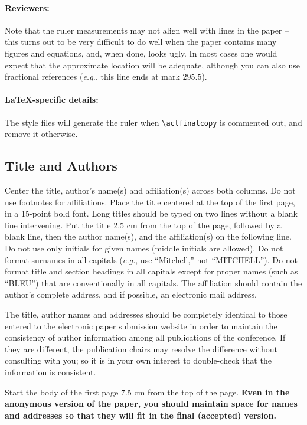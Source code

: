\documentclass[11pt,a4paper]{article}
\begin{document}
\paragraph{Reviewers:}
Note that the ruler measurements may not align well with lines in the paper -- this turns out to be very difficult to do well when the paper contains many figures and equations, and, when done, looks ugly.
In most cases one would expect that the approximate location will be adequate, although you can also use fractional references (\emph{e.g.}, this line ends at mark $295.5$).

\paragraph{\LaTeX-specific details:}
The style files will generate the ruler when {\small\verb|\aclfinalcopy|} is commented out, and remove it otherwise.

\subsection{Title and Authors}
\label{ssec:title-authors}

Center the title, author's name(s) and affiliation(s) across both columns.
Do not use footnotes for affiliations.
Place the title centered at the top of the first page, in a 15-point bold font.
Long titles should be typed on two lines without a blank line intervening.
Put the title 2.5 cm from the top of the page, followed by a blank line, then the author name(s), and the affiliation(s) on the following line.
Do not use only initials for given names (middle initials are allowed).
Do not format surnames in all capitals (\emph{e.g.}, use ``Mitchell,'' not ``MITCHELL'').
Do not format title and section headings in all capitals except for proper names (such as ``BLEU'') that are
conventionally in all capitals.
The affiliation should contain the author's complete address, and if possible, an electronic mail address.

The title, author names and addresses should be completely identical to those entered to the electronic paper submission website in order to maintain the consistency of author information among all publications of the conference.
If they are different, the publication chairs may resolve the difference without consulting with you; so it is in your own interest to double-check that the information is consistent.

Start the body of the first page 7.5 cm from the top of the page.
\textbf{Even in the anonymous version of the paper, you should maintain space for names and addresses so that they will fit in the final (accepted) version.}
\end{document}
